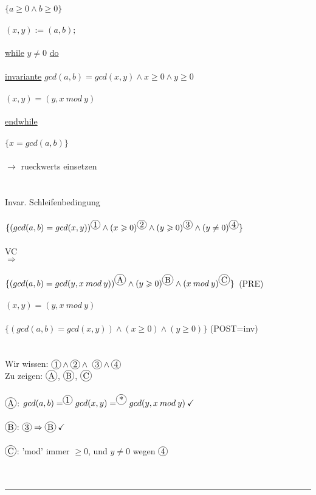 \documentclass[18pt,a4paper]{article}
\newcommand*\circled[1]{\tikz[baseline=(char.base)]{
            \node[shape=circle,draw,inner sep=1pt] (char) {#1};}}
\newcommand{\tab}{\hspace*{2em}}
\begin{document}
$\{a\geqslant 0 \wedge b\geqslant 0\}$\\
\\
$(x,y) := (a,b);$\\
\\
\uline{while} $y \neq 0$ \uline{do}\\
\\
\tab \uline{invariante} $gcd(a,b) = gcd(x,y) \wedge x\geqslant 0 \wedge y\geqslant 0$\\
\\
$(x,y) = (y, x\: mod\: y)$\\
\\
\uline{endwhile}\\
\\
$\{x = gcd(a,b)\}$\\
\\
$\rightarrow$ rueckwerts einsetzen\\
\\
\\
Invar. Schleifenbedingung\\
\\
$\{ (gcd(a,b) = gcd(x,y))^{\circled{1}} \wedge (x\geqslant 0)^{\circled{2}} \wedge (y\geqslant 0)^{\circled{3}} \wedge (y\neq 0)^{\circled{4}}\}$\\
\\
VC\\
$\Rightarrow$\\
\\
$\{ (gcd(a,b) = gcd(y,x\: mod\: y))^{\circled{A}} \wedge (y\geqslant 0)^{\circled{B}} \wedge (x\: mod\: y)^{\circled{C}} \}$ (PRE)\\
\\
$(x,y) = (y, x\: mod\: y)$\\
\\
$\{ (gcd(a,b) = gcd(x,y)) \wedge (x\geqslant 0) \wedge (y\geqslant 0) \}$ (POST=inv)\\
\\
\\
Wir wissen: $\circled{1} \wedge \circled{2} \wedge\ \circled{3} \wedge \circled{4}$\\
Zu zeigen: $\circled{A}$, $\circled{B}$, $\circled{C}$\\
\\
$\circled{A}$: $gcd(a,b) =^{\circled{1}} gcd(x,y) =^{\circled{*}} gcd(y, x\: mod\: y)\: \checkmark$\\
\\
$\circled{B}$: $\circled{3} \Rightarrow \circled{B}\: \checkmark$\\
\\
$\circled{C}$: 'mod' immer $\geqslant 0$, und $y \neq 0$ wegen $\circled{4}$\\
\\
\\
\rule{\textwidth}{0.4mm}\\
\\
\end{document}
